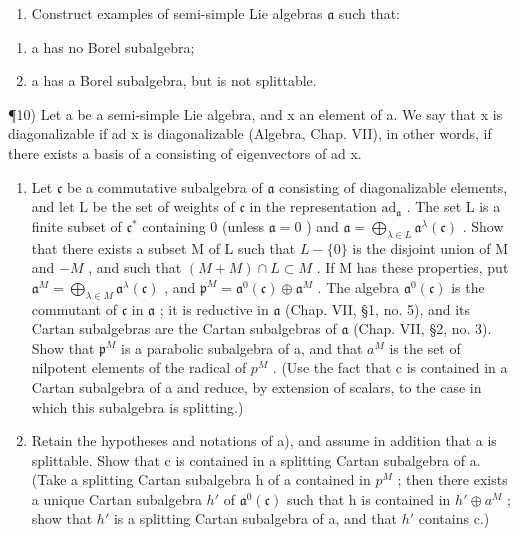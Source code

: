
\begin{enumerate}
\def\labelenumi{\arabic{enumi})}
\setcounter{enumi}{8}
\tightlist
\item
  Construct examples of semi-simple Lie algebras \(\mathfrak{a}\) such that:
\end{enumerate}

\begin{enumerate}
\def\labelenumi{\roman{enumi})}
\item
  a has no Borel subalgebra;
\item
  a has a Borel subalgebra, but is not splittable.
\end{enumerate}

¶10) Let a be a semi-simple Lie algebra, and x an element of a. We say that x is diagonalizable if ad x is diagonalizable (Algebra, Chap. VII), in other words, if there exists a basis of a consisting of eigenvectors of ad x.

\begin{enumerate}
\def\labelenumi{\alph{enumi})}
\item
  Let \(\mathfrak{c}\) be a commutative subalgebra of \(\mathfrak{a}\) consisting of diagonalizable elements, and let L be the set of weights of \(\mathfrak{c}\) in the representation \(\mathrm{ad}_{\mathfrak{a}}\) . The set L is a finite subset of \(\mathfrak{c}^*\) containing 0 (unless \(\mathfrak{a} = 0\) ) and \(\mathfrak{a} = \bigoplus_{\lambda \in L} \mathfrak{a}^{\lambda}(\mathfrak{c})\) . Show that there exists a subset M of L such that \(L - \{0\}\) is the disjoint union of M and \(-M\) , and such that \((M + M) \cap L \subset M\) . If M has these properties, put \(\mathfrak{a}^{M} = \bigoplus_{\lambda \in M} \mathfrak{a}^{\lambda}(\mathfrak{c})\) , and \(\mathfrak{p}^{M} = \mathfrak{a}^{0}(\mathfrak{c}) \oplus \mathfrak{a}^{M}\) . The algebra \(\mathfrak{a}^{0}(\mathfrak{c})\) is the commutant of \(\mathfrak{c}\) in \(\mathfrak{a}\) ; it is reductive in \(\mathfrak{a}\) (Chap. VII, §1, no. 5), and its Cartan subalgebras are the Cartan subalgebras of \(\mathfrak{a}\) (Chap. VII, §2, no. 3). Show that \(\mathfrak{p}^{M}\) is a parabolic subalgebra of a, and that \(a^{M}\) is the set of nilpotent elements of the radical of \(p^{M}\) . (Use the fact that c is contained in a Cartan subalgebra of a and reduce, by extension of scalars, to the case in which this subalgebra is splitting.)
\item
  Retain the hypotheses and notations of a), and assume in addition that a is splittable. Show that c is contained in a splitting Cartan subalgebra of a. (Take a splitting Cartan subalgebra h of a contained in \(p^{M}\) ; then there exists a unique Cartan subalgebra \(h'\) of \(\mathfrak{a}^{0}(\mathfrak{c})\) such that h is contained in \(h' \oplus a^{M}\) ; show that \(h'\) is a splitting Cartan subalgebra of a, and that \(h'\) contains c.)
\end{enumerate}

